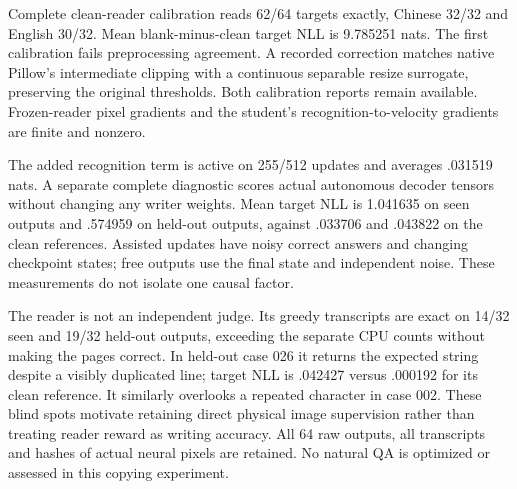 Complete clean-reader calibration reads 62/64 targets exactly, Chinese 32/32
and English 30/32. Mean blank-minus-clean target NLL is 9.785251 nats. The
first calibration fails preprocessing agreement. A recorded correction
matches native Pillow's intermediate clipping with a continuous separable
resize surrogate, preserving the original thresholds. Both calibration
reports remain available. Frozen-reader pixel gradients and the student's
recognition-to-velocity gradients are finite and nonzero.

The added recognition term is active on 255/512 updates and averages
.031519 nats. A separate complete diagnostic scores actual autonomous
decoder tensors without changing any writer weights. Mean target NLL is
1.041635 on seen outputs and .574959 on held-out outputs, against .033706
and .043822 on the clean references. Assisted updates have noisy correct
answers and changing checkpoint states; free outputs use the final state
and independent noise. These measurements do not isolate one causal factor.

The reader is not an independent judge. Its greedy transcripts are exact
on 14/32 seen and 19/32 held-out outputs, exceeding the separate CPU counts
without making the pages correct. In held-out case 026 it returns the
expected string despite a visibly duplicated line; target NLL is .042427
versus .000192 for its clean reference. It similarly overlooks a repeated
character in case 002. These blind spots motivate retaining direct physical
image supervision rather than treating reader reward as writing accuracy.
All 64 raw outputs, all transcripts and hashes of actual neural pixels are
retained. No natural QA is optimized or assessed in this copying experiment.

\clearpage
{}
